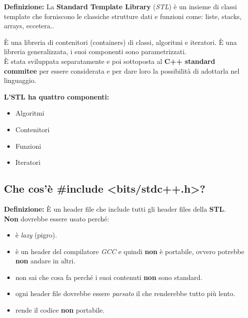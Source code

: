 \textsf{\small \textbf{Definizione: } La \textbf{Standard Template Library} (\emph{STL}) è un insieme di classi template che forniscono le classiche strutture dati e funzioni come: liste, stacks, arrays, eccetera..} \break

\textsf{\small È una libreria di contenitori (containers) di classi, algoritmi e iteratori. È una libreria generalizzata, i suoi componenti sono parametrizzati.} \\

\textsf{\small È stata sviluppata separatamente e poi sottoposta al \textbf{C++ standard commitee} per essere considerata e per dare loro la possibilità di adottarla nel linguaggio.} \break

\textsf{\small \textbf{L'STL ha quattro componenti: } } \\

\begin{itemize}
	\item \textsf{\small Algoritmi}
	\item \textsf{\small Contenitori}
	\item \textsf{\small Funzioni}
	\item \textsf{\small Iteratori}
\end{itemize}

\subsection{Che cos'è \#include <bits/stdc++.h>?}

\textsf{\small \textbf{Definizione: } È un header file che include tutti gli header files della \textbf{STL}.} \\

\textsf{\small \textbf{Non} dovrebbe essere usato perché: } \\

\begin{itemize}
	\item \textsf{\small è \emph{lazy} (pigro).}
	\item \textsf{\small è un header del compilatore \emph{GCC} e quindi \textbf{non} è portabile, ovvero potrebbe \textbf{non} andare in altri.}
	\item \textsf{\small non sai che cosa fa perché i suoi contenuti \textbf{non} sono standard.}
	\item \textsf{\small ogni header file dovrebbe essere \emph{parsato} il che renderebbe tutto più lento.}
	\item \textsf{\small rende il codice \textbf{non} portabile.}
\end{itemize}

